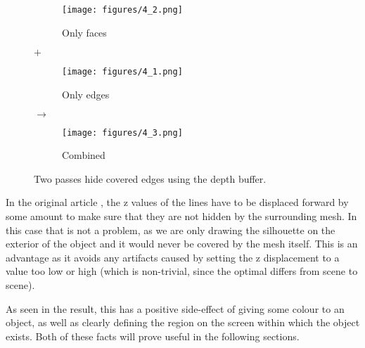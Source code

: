 \documentclass[a4paper,10pt]{article}
\begin{document}
\begin{figure}[htbp!]
  \centering
  \begin{subfigure}{0.3\columnwidth}
    \texttt{[image: figures/4\_2.png]}
    \caption{Only faces}
  \end{subfigure}%
  $\bm{+}$%
  \begin{subfigure}{0.3\columnwidth}
    \texttt{[image: figures/4\_1.png]}
    \caption{Only edges}
  \end{subfigure}%
  $\bm{\longrightarrow}$%
  \begin{subfigure}{0.3\columnwidth}
    \texttt{[image: figures/4\_3.png]}
    \caption{Combined}
  \end{subfigure}
  \caption{Two passes hide covered edges using the depth buffer.}
  \label{cover}
\end{figure}


In the original article \cite{Rossignac1992}, the z values of the lines have to be displaced forward by some amount to make sure that they are not hidden by the surrounding mesh. In this case that is not a problem, as we are only drawing the silhouette on the exterior of the object and it would never be covered by the mesh itself. This is an advantage as it avoids any artifacts caused by setting the z displacement to a value too low or high (which is non-trivial, since the optimal differs from scene to scene).

As seen in the result, this has a positive side-effect of giving some colour to an object, as well as clearly defining the region on the screen within which the object exists. Both of these facts will prove useful in the following sections.
\end{document}
